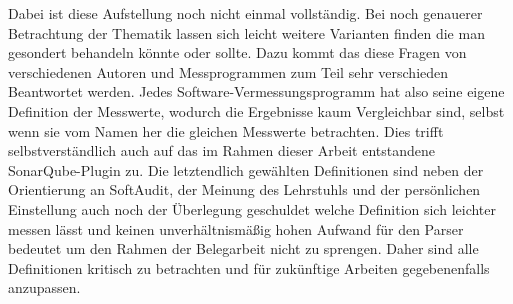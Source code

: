 \documentclass[gb,ngerman]{stthesis}
\begin{document}
  				Dabei ist diese Aufstellung noch nicht einmal vollständig. Bei noch genauerer Betrachtung der Thematik lassen sich leicht weitere Varianten finden die man gesondert behandeln könnte oder sollte. Dazu kommt das diese Fragen von verschiedenen Autoren und Messprogrammen zum Teil sehr verschieden Beantwortet werden. Jedes Software-Vermessungsprogramm hat also seine eigene Definition der Messwerte, wodurch die Ergebnisse kaum Vergleichbar sind, selbst wenn sie vom Namen her die gleichen Messwerte betrachten. Dies trifft selbstverständlich auch auf das im Rahmen dieser Arbeit entstandene SonarQube-Plugin zu. Die letztendlich gewählten Definitionen sind neben der Orientierung an SoftAudit, der Meinung des Lehrstuhls und der persönlichen Einstellung auch noch der Überlegung geschuldet welche Definition sich leichter messen lässt und keinen unverhältnismäßig hohen Aufwand für den Parser bedeutet um den Rahmen der Belegarbeit nicht zu sprengen. Daher sind alle Definitionen kritisch zu betrachten und für zukünftige Arbeiten gegebenenfalls anzupassen.   
\end{document}
